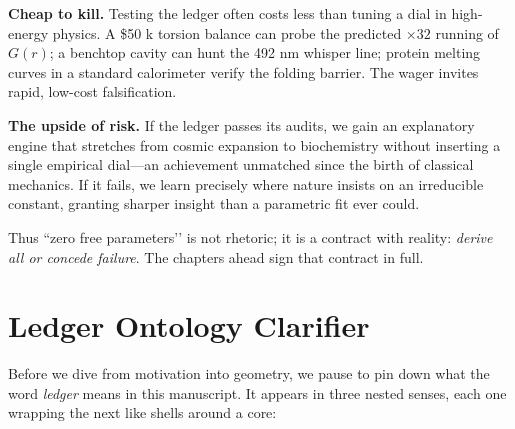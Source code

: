 \documentclass[11pt,oneside]{book}
\begin{document}
\vspace{0.5\baselineskip}
\noindent\textbf{Cheap to kill.}
Testing the ledger often costs less than tuning a dial in high-energy
physics.  A \$50 k torsion balance can probe the predicted
\(\times32\) running of \(G(r)\); a benchtop cavity can hunt the 492 nm
whisper line; protein melting curves in a standard calorimeter verify
the folding barrier.  The wager invites rapid, low-cost falsification.

\vspace{0.5\baselineskip}
\noindent\textbf{The upside of risk.}
If the ledger passes its audits, we gain an explanatory engine that
stretches from cosmic expansion to biochemistry without inserting a
single empirical dial—an achievement unmatched since the birth of
classical mechanics.  If it fails, we learn precisely where nature
insists on an irreducible constant, granting sharper insight than a
parametric fit ever could.

\medskip
\noindent
Thus “zero free parameters’’ is not rhetoric; it is a contract with
reality: \emph{derive all or concede failure}.  The chapters ahead sign
that contract in full.

\section*{Ledger Ontology Clarifier}
\label{sec:ledger-ontology}

Before we dive from motivation into geometry, we pause to pin down what
the word \emph{ledger} means in this manuscript.  It appears in three
nested senses, each one wrapping the next like shells around a core:
\end{document}
